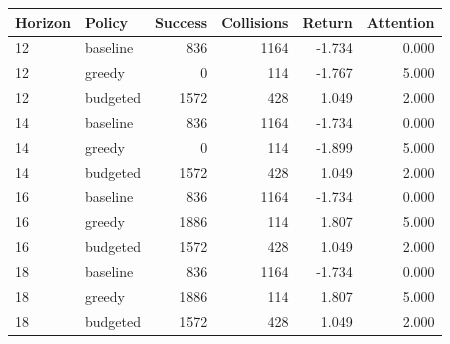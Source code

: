 \begin{tabular}{llrrrr}
\toprule
Horizon & Policy & Success & Collisions & Return & Attention \\
\midrule
12 & baseline & 836 & 1164 & -1.734 & 0.000 \\
12 & greedy & 0 & 114 & -1.767 & 5.000 \\
12 & budgeted & 1572 & 428 & 1.049 & 2.000 \\
14 & baseline & 836 & 1164 & -1.734 & 0.000 \\
14 & greedy & 0 & 114 & -1.899 & 5.000 \\
14 & budgeted & 1572 & 428 & 1.049 & 2.000 \\
16 & baseline & 836 & 1164 & -1.734 & 0.000 \\
16 & greedy & 1886 & 114 & 1.807 & 5.000 \\
16 & budgeted & 1572 & 428 & 1.049 & 2.000 \\
18 & baseline & 836 & 1164 & -1.734 & 0.000 \\
18 & greedy & 1886 & 114 & 1.807 & 5.000 \\
18 & budgeted & 1572 & 428 & 1.049 & 2.000 \\
\bottomrule
\end{tabular}
